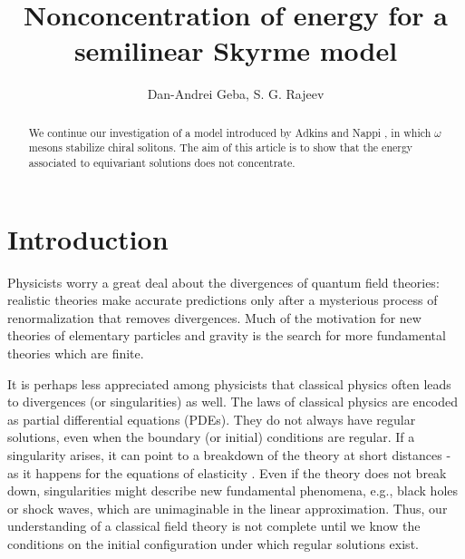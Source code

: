 \documentclass{amsart}
\begin{document}
\title{Nonconcentration of energy for a semilinear Skyrme model}

\author{Dan-Andrei Geba, S. G. Rajeev} 

\address{Department of Mathematics,
University of Rochester, Rochester, NY 14627, USA}

\address{Department of Physics and Astronomy,  Department of Mathematics,
University of Rochester,
Rochester, NY 14627, USA}


\date{}

\begin{abstract}
We continue our investigation \cite{GR1} of a model introduced by Adkins and Nappi \cite{AN}, in which $\omega$ mesons stabilize chiral solitons. The aim of this article is to show that the energy associated to equivariant solutions does not concentrate.
\end{abstract}

\maketitle

\section{Introduction}

Physicists worry a great deal about the divergences of quantum field theories: realistic theories make accurate predictions only after a mysterious process of renormalization that removes divergences. Much of the motivation for new theories of elementary particles and gravity is the search for more fundamental theories which are finite.

It is perhaps less appreciated among physicists that classical physics often leads to divergences (or singularities) as well. The laws of classical physics are encoded as partial differential equations (PDEs). They do not always have regular solutions, even when the boundary (or initial) conditions are regular. If a singularity arises, it can point to a  breakdown of the  theory at short distances - as it happens for the equations of elasticity \cite{Gladwell}. Even if the theory does not break down,  singularities  might describe new fundamental phenomena, e.g., black holes or shock waves, which are unimaginable in the linear approximation. Thus, our understanding of a classical field theory is not complete until we know the conditions on the initial configuration under which regular solutions exist.
\end{document}
